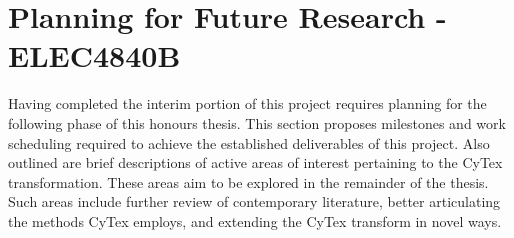 \chapter{Planning for Future Research - ELEC4840B}\label{ch-plan}
Having completed the interim portion of this project requires planning for the following phase of this honours thesis. This section proposes milestones and work scheduling required to achieve the established deliverables of this project. Also outlined are brief descriptions of active areas of interest pertaining to the CyTex transformation. These areas aim to be explored in the remainder of the thesis. Such areas include further review of contemporary literature, better articulating the methods CyTex employs, and extending the CyTex transform in novel ways.


